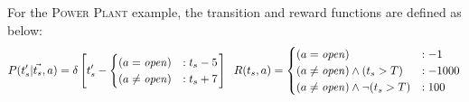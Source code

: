 \documentclass{article} %
\newcommand{\open}{\mathit{open}}
\begin{document}
For the \textsc{Power Plant} example, the transition and reward functions are defined as below:
{\footnotesize
\vspace{-1mm}
\begin{align}
P(t_s'|\vec{t_s},a)= \delta\left[ t_s' - 
\begin{cases}
 (a=\open) &: t_s - 5 \\ 
(a \neq \open) &: t_s + 7 \\
\end{cases}
\right]
\hspace{2mm}
R(t_s,a) = 
\begin{cases}
 (a=\open) &: -1 \\
(a \neq \open)\wedge (t_s>T) &: -1000 \\
(a \neq \open)\wedge \neg(t_s>T) &: 100 \\
\end{cases}
\end{align}
\vspace{-4mm}
}
\end{document}
